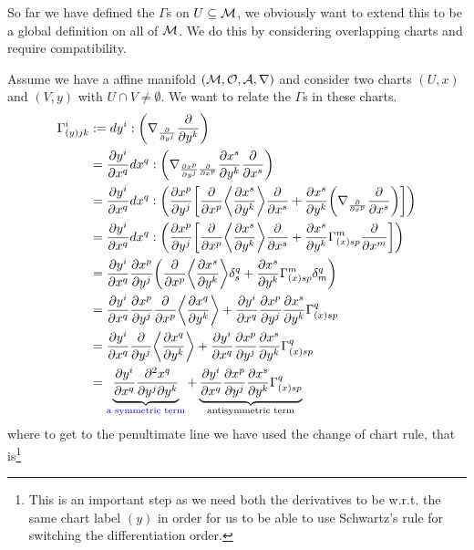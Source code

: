 \documentclass[12pt]{article} %
\begin{document}
So far we have defined the $\Gamma$s on $U\subseteq\mathcal{M}$, we obviously want to extend this to be a global definition on all of $\mathcal{M}$. We do this by considering overlapping charts and require compatibility. 

Assume we have a affine manifold $(\mathcal{M},\mathcal{O},\mathcal{A},\nabla)$ and consider two charts $(U,x)$ and $(V,y)$ with $U\cap V \neq \emptyset$. We want to relate the $\Gamma$s in these charts. 
\begin{align} 
    \begin{split}
        \Gamma^i_{(y)jk} & := dy^i : \bigg( \nabla_{\frac{\partial}{\partial y^j}}\frac{\partial}{\partial y^k}\bigg) \\
        & = \frac{\partial y^i}{\partial x^q} dx^q : \bigg( \nabla_{\frac{\partial x^p}{\partial y^j}\frac{\partial}{\partial x^p}} \frac{\partial x^s}{\partial y^k}\frac{\partial}{\partial x^s}\bigg) \\
        & = \frac{\partial y^i}{\partial x^q} dx^q : \bigg( \frac{\partial x^p}{\partial y^j} \bigg[ \frac{\partial}{\partial x^p}\bigg\langle\frac{\partial x^s}{\partial y^k}\bigg\rangle \frac{\partial}{\partial x^s} + \frac{\partial x^s}{\partial y^k} \bigg(\nabla_{\frac{\partial}{\partial x^p}} \frac{\partial}{\partial x^s}\bigg)\bigg]\bigg) \\
        & = \frac{\partial y^i}{\partial x^q} dx^q : \bigg( \frac{\partial x^p}{\partial y^j} \bigg[ \frac{\partial}{\partial x^p}\bigg\langle\frac{\partial x^s}{\partial y^k}\bigg\rangle \frac{\partial}{\partial x^s} + \frac{\partial x^s}{\partial y^k} \Gamma^m_{(x)sp} \frac{\partial}{\partial x^m}\bigg]\bigg) \\
        & = \frac{\partial y^i}{\partial x^q} \frac{\partial x^p}{\partial y^j} \bigg( \frac{\partial}{\partial x^p}\bigg\langle\frac{\partial x^s}{\partial y^k}\bigg\rangle \delta^q_s + \frac{\partial x^s}{\partial y^k} \Gamma^{m}_{(x)sp} \delta^q_m\bigg) \\
        & = \frac{\partial y^i}{\partial x^q} \frac{\partial x^p}{\partial y^j} \frac{\partial}{\partial x^p}\bigg\langle\frac{\partial x^q}{\partial y^k}\bigg\rangle  +  \frac{\partial y^i}{\partial x^q} \frac{\partial x^p}{\partial y^j}\frac{\partial x^s}{\partial y^k} \Gamma^{q}_{(x)sp} \\
        & = \frac{\partial y^i}{\partial x^q} \frac{\partial}{\partial y^j}\bigg\langle \frac{\partial x^q}{\partial y^k}\bigg\rangle + \frac{\partial y^i}{\partial x^q} \frac{\partial x^p}{\partial y^j}\frac{\partial x^s}{\partial y^k} \Gamma^{q}_{(x)sp} \\
        & = \underbrace{\frac{\partial y^i}{\partial x^q} \frac{\partial^2 x^q}{\partial y^j\partial y^k}}_{\textcolor{blue}{\text{a symmetric term}}} + \underbrace{\frac{\partial y^i}{\partial x^q} \frac{\partial x^p}{\partial y^j}\frac{\partial x^s}{\partial y^k} \Gamma^{q}_{(x)sp}}_{\text{antisymmetric term}}
    \end{split}\label{eq:omeqrv}
\end{align} 
where to get to the penultimate line we have used the change of chart rule, that is\footnote{This is an important step as we need both the derivatives to be w.r.t. the same chart label $(y)$ in order for us to be able to use Schwartz's rule for switching the differentiation order. }
\end{document}
